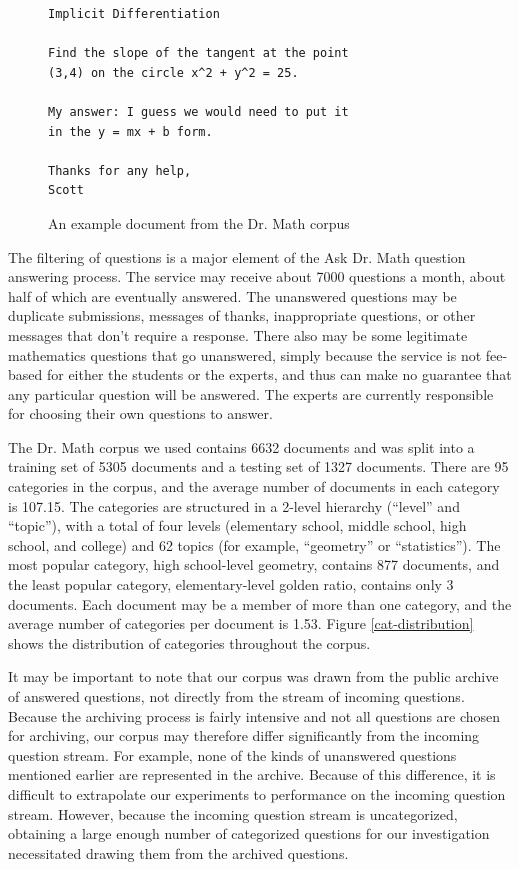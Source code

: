 \documentclass{ios}
\begin{document}
\begin{figure}
\begin{verbatim}
Implicit Differentiation

Find the slope of the tangent at the point
(3,4) on the circle x^2 + y^2 = 25.

My answer: I guess we would need to put it
in the y = mx + b form. 

Thanks for any help,
Scott
\end{verbatim}
\caption{An example document from the Dr. Math corpus}
\label{example-question}
\end{figure}

The filtering of questions is a major element of the Ask Dr. Math
question answering process.  The service may receive about 7000
questions a month, about half of which are eventually answered.  The
unanswered questions may be duplicate submissions, messages of thanks,
inappropriate questions, or other messages that don't require a
response.  There also may be some legitimate mathematics questions
that go unanswered, simply because the service is not fee-based for
either the students or the experts, and thus can make no guarantee
that any particular question will be answered.  The experts are
currently responsible for choosing their own questions to answer.

The Dr. Math corpus we used contains 6632 documents and was split into a training
set of 5305 documents and a testing set of 1327 documents.  There are 95 categories 
in the corpus, and the average number of documents in each category is
107.15.  The categories are structured in a 2-level hierarchy
(``level'' and ``topic''), with a total of four levels (elementary
school, middle school, high school, and college) and 62 topics (for
example, ``geometry'' or ``statistics'').
The most popular category, high school-level geometry,
contains 877 documents, and the least popular category,
elementary-level golden ratio, contains only 3 documents.  Each
document may be a member of more than one category, and the average
number of categories per document is 1.53.  Figure
\ref{cat-distribution} shows the distribution of categories throughout
the corpus.

It may be important to note that our corpus was drawn from the public
archive of answered questions, not directly from the stream of
incoming questions.  Because the archiving process is fairly intensive
and not all questions are chosen for archiving, our corpus may
therefore differ significantly from the incoming question stream.  For
example, none of the kinds of unanswered questions mentioned earlier
are represented in the archive.  Because of this difference, it is
difficult to extrapolate our experiments to performance on the
incoming question stream.  However, because the incoming question
stream is uncategorized, obtaining a large enough number of
categorized questions for our investigation necessitated drawing them
from the archived questions.
\end{document}

